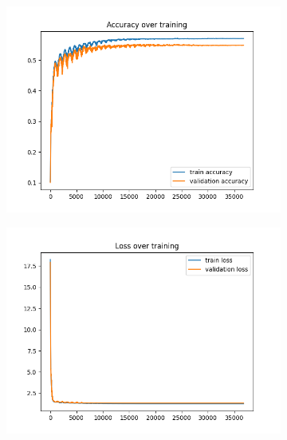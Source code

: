 \documentclass[a4paper]{article}
\begin{document}
\begin{figure}[h]
	\centering
	\begin{subfigure}{0.3\textwidth}
		\centering
		\includegraphics[width=\linewidth]{images/Final_cycle_tracker_acc.png}
		\caption{}
	\end{subfigure}
	\begin{subfigure}{0.3\textwidth}
		\centering
		\includegraphics[width=\linewidth]{images/Final_cycle_tracker_loss.png}
		\caption{}
	\end{subfigure}
	\begin{subfigure}{0.3\textwidth}
		\centering

\end{subfigure}
\end{figure}
\end{document}
